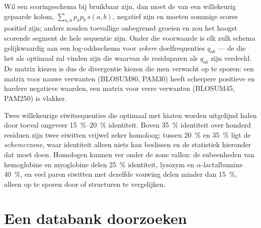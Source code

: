 \begin{proposition}\label{prop:b3:bioinformatics:logodds}
Wil een scoringsschema bij  bruikbaar zijn, dan moet de
 van een willekeurig gepaarde kolom,
$\sum_{a,b} p_{a} p_{b}\, s(a,b)$, negatief zijn en moeten sommige
scores positief zijn; anders zouden toevallige 
onbegrensd groeien en zou het hoogst scorende segment de hele sequentie
zijn. Onder die voorwaarde is elk zulk schema gelijkwaardig aan een
log-oddsschema voor \emph{zekere} doelfrequenties $q_{ab}$ --- de
 die het als optimaal zal vinden zijn die waarvan de
residuparen als $q_{ab}$ zijn verdeeld. De matrix kiezen is dus de
divergentie kiezen die men verwacht op te sporen: een matrix voor nauwe
verwanten (BLOSUM80, PAM30) heeft scherpere positieve en hardere
negatieve waarden, een matrix voor verre verwanten (BLOSUM45, PAM250)
is vlakker.
\end{proposition}
\admitted

\begin{example}\label{ex:b3:bioinformatics:twilight}
Twee willekeurige eiwitsequenties die optimaal met hiaten worden
uitgelijnd halen door toeval ongeveer \qtyrange{15}{20}{\%}
identiteit. Boven \qty{35}{\%} identiteit over honderd residuen zijn
twee eiwitten vrijwel zeker homoloog; tussen \qty{20}{\%} en
\qty{35}{\%} ligt de \emph{schemerzone}, waar identiteit alleen niets
kan beslissen en de statistiek hieronder dat moet doen. Homologen
kunnen ver onder de zone vallen: de subeenheden van hemoglobine en
myoglobine delen \qty{25}{\%} identiteit, lysozym en
$\alpha$-lactalbumine \qty{40}{\%}, en veel paren eiwitten met dezelfde
vouwing delen minder dan \qty{15}{\%}, alleen op te sporen door
 of structuren te vergelijken.
\end{example}

\section{Een databank doorzoeken}

